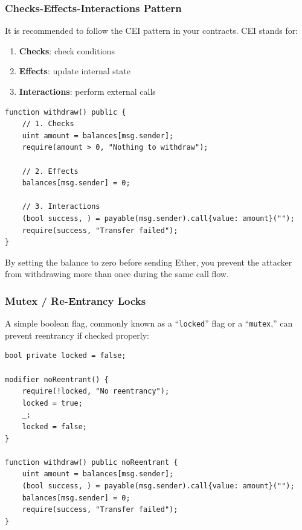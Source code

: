 \documentclass[12pt]{article}
\newcommand{\codeinline}[1]{\texttt{#1}}
\begin{document}
\subsubsection*{Checks-Effects-Interactions Pattern}

It is recommended to follow the CEI pattern in your contracts. CEI stands for:

\begin{enumerate}
    \item \textbf{Checks}: check conditions
    \item \textbf{Effects}: update internal state
    \item \textbf{Interactions}: perform external calls
\end{enumerate}

\noindent
\begin{minipage}{\textwidth}
    \begin{lstlisting}[language=Solidity]
function withdraw() public {
    // 1. Checks
    uint amount = balances[msg.sender];
    require(amount > 0, "Nothing to withdraw");

    // 2. Effects
    balances[msg.sender] = 0;

    // 3. Interactions
    (bool success, ) = payable(msg.sender).call{value: amount}("");
    require(success, "Transfer failed");
}
\end{lstlisting}
\end{minipage}

\noindent
By setting the balance to zero before sending Ether, you prevent the attacker from withdrawing more than once during the same call flow.

\subsubsection*{Mutex / Re-Entrancy Locks}

A simple boolean flag, commonly known as a “\codeinline{locked}” flag or a
“\codeinline{mutex},” can prevent reentrancy if checked properly:

\noindent
\begin{minipage}{\textwidth}
    \begin{lstlisting}[language=Solidity]
bool private locked = false;

modifier noReentrant() {
    require(!locked, "No reentrancy");
    locked = true;
    _;
    locked = false;
}

function withdraw() public noReentrant {
    uint amount = balances[msg.sender];
    (bool success, ) = payable(msg.sender).call{value: amount}("");
    balances[msg.sender] = 0;
    require(success, "Transfer failed");
}
\end{lstlisting}
\end{minipage}
\end{document}
